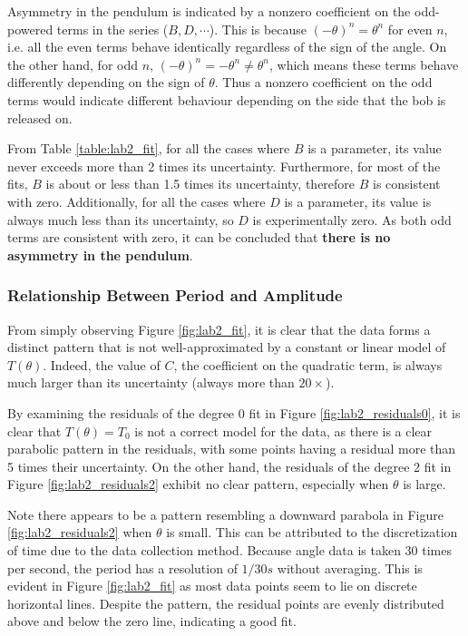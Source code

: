 \documentclass[aps,twocolumn,secnumarabic,nobalancelastpage,amsmath,amssymb,nofootinbib,floatfix,letterpaper]{revtex4}
\begin{document}
Asymmetry in the pendulum is indicated by a nonzero coefficient on the odd-powered terms in the series (\(B, D, \cdots\)).
This is because \((-\theta)^n = \theta^n\) for even \(n\), i.e. all the even terms behave identically regardless of the
sign of the angle. On the other hand, for odd \(n\), \((-\theta)^n = -\theta^n \neq \theta^n\), which means these terms behave
differently depending on the sign of \(\theta\). Thus a nonzero coefficient on the odd terms would indicate different
behaviour depending on the side that the bob is released on.

From Table \ref{table:lab2_fit}, for all the cases where \(B\) is a parameter, its value never exceeds more than 2 times its
uncertainty. Furthermore, for most of the fits, \(B\) is about or less than 1.5 times its uncertainty, therefore
\(B\) is consistent with zero. Additionally, for all the cases where \(D\) is a parameter, its value is always much less
than its uncertainty, so \(D\) is experimentally zero. As both odd terms are consistent with zero, it can be
concluded that \textbf{there is no asymmetry in the pendulum}.

\subsubsection{Relationship Between Period and Amplitude}
\label{sec:lab2_relationship}

From simply observing Figure \ref{fig:lab2_fit}, it is clear that the data forms a distinct pattern that is not
well-approximated by a constant or linear model of \(T(\theta)\). Indeed, the value of \(C\), the coefficient on the
quadratic term, is always much larger than its uncertainty (always more than \(20 \times\)).

By examining the residuals of the degree 0 fit in Figure \ref{fig:lab2_residuals0}, it is clear that \(T(\theta) = T_0\)
is not a correct model for the data, as there is a clear parabolic pattern in the residuals, with some points having a
residual more than 5 times their uncertainty. On the other hand, the residuals of the degree 2 fit in Figure
\ref{fig:lab2_residuals2} exhibit no clear pattern, especially when \(\theta\) is large.

Note there appears to be a pattern resembling a downward parabola in Figure \ref{fig:lab2_residuals2} when \(\theta\) is
small. This can be attributed to the discretization of time due to the data collection method. Because angle data is
taken 30 times per second, the period has a resolution of \(1/30\si{s}\) without averaging. This is evident in Figure
\ref{fig:lab2_fit} as most data points seem to lie on discrete horizontal lines. Despite the pattern, the residual
points are evenly distributed above and below the zero line, indicating a good fit.
\end{document}
